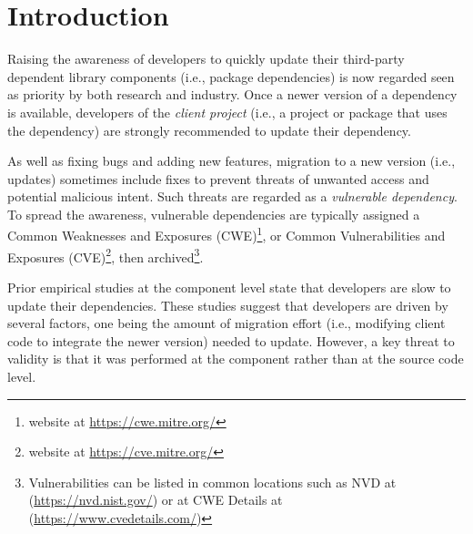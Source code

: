 \chapter{Introduction}
Raising the awareness of developers to quickly update their third-party dependent library components (i.e., package dependencies) is now regarded seen as priority by both research and industry\cite{Bogart:2016, Mirhosseini:2017, Kula:2018, Kikas:2017}.
Once a newer version of a dependency is available, developers of the \textit{client project} (i.e., a project or package that uses the dependency) are strongly recommended to update their dependency.

As well as fixing bugs and adding new features, migration to a new version (i.e., updates) sometimes include fixes to prevent threats of unwanted access and potential malicious intent.
Such threats are regarded as a \textit{vulnerable dependency}.
To spread the awareness, vulnerable dependencies are typically assigned a Common Weaknesses and Exposures (CWE)\footnote{website at \url{https://cwe.mitre.org/}},  or Common Vulnerabilities and Exposures (CVE)\footnote{website at \url{https://cve.mitre.org/}}, then  archived\footnote{Vulnerabilities can be listed in common locations such as  NVD at (\url{https://nvd.nist.gov/}) or at CWE Details at (\url{https://www.cvedetails.com/})}. 

Prior empirical studies at the component level state that developers are slow to update their dependencies. 
These studies suggest that developers are driven by several factors, one being the amount of migration effort (i.e., modifying client code to integrate the newer version) needed to update.
However, a key threat to validity is that it was performed at the component rather than at the source code level. 


